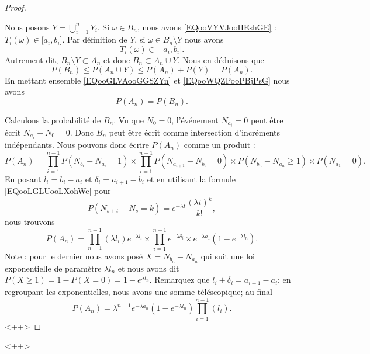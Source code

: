 \begin{proof}
\begin{subproof}
        Nous posons \( Y=\bigcup_{i=1}^nY_i\).
        \spitem[\( P(B_n)\leq P(A_n)\)]
        Si \( \omega\in B_n\), nous avons \eqref{EQooVYVJooHEshGE} : \( T_i(\omega)\in \mathopen[ a_i , b_i \mathclose]\). Par définition de \( Y\), si \( \omega\in B_n\setminus Y\) nous avons
        \begin{equation}
    T_i(\omega)\in \mathopen] a_i , b_i \mathclose].
        \end{equation}
        Autrement dit, \( B_n\setminus Y\subset A_n\) et donc \( B_n\subset A_n\cup Y\). Nous en déduisons que
        \begin{equation}    \label{EQooWQZPooPBjPsG}
            P(B_n)\leq P(A_n\cup Y)\leq P(A_n)+P(Y)=P(A_n).
        \end{equation}
        \spitem[\( P(A_n)=P(B_n)\)]
        En mettant ensemble \eqref{EQooGLVAooGGSZYn} et \eqref{EQooWQZPooPBjPsG} nous avons
        \begin{equation}
            P(A_n)=P(B_n).
        \end{equation}
    \end{subproof}
    Calculons la probabilité de \( B_n\). Vu que \( N_0=0\), l'événement \( N_{a_i}=0\) peut être écrit \( N_{a_i}-N_0=0\). Donc \( B_n\) peut être écrit comme intersection d'incréments indépendants. Nous pouvons donc écrire \( P(A_n)\) comme un produit :
    \begin{equation}
        P(A_n)=\prod_{i=1}^{n-1}P(N_{b_i}-N_{a_i}=1)\times\prod_{i=1}^{n-1}P(N_{a_{i+1}}-N_{b_i}=0)\times P(N_{b_n}-N_{a_n}\geq 1)\times P(N_{a_1}=0).
    \end{equation}
    En posant \( l_i=b_i-a_i\) et \( \delta_i=a_{i+1}-b_i\) et en utilisant la formule \eqref{EQooLGLUooLXohWe} pour
    \begin{equation}
        P(N_{s+t}-N_s=k)= e^{-\lambda t}\frac{ (\lambda t)^k }{ k! },
    \end{equation}
    nous trouvons
    \begin{equation}
        P(A_n)=\prod_{n=1}^{n-1}(\lambda l_i) e^{-\lambda l_l}\times \prod_{i=1}^{n-1} e^{-\lambda \delta_i}\times  e^{-\lambda a_1}(1- e^{-\lambda l_n}).
    \end{equation}
    Note : pour le dernier nous avons posé \( X=N_{b_n}-N_{a_n}\) qui suit une loi exponentielle de paramètre \( \lambda l_n\) et nous avons dit $P(X\geq 1)=1-P(X=0)=1- e^{\lambda l_n}$. Remarquez que \( l_i+\delta_i=a_{i+1}-a_i\); en regroupant les exponentielles, nous avons une somme téléscopique; au final
    \begin{equation}
        P(A_n)=\lambda^{n-1} e^{-\lambda a_n}(1- e^{-\lambda l_n})\prod_{i=1}^{n-1}(l_i).
    \end{equation}
    <++>

\end{proof}
<++>

